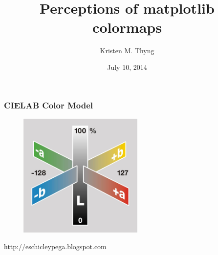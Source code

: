 \documentclass[ignorenonframetext]{beamer}
\title[SciPy 2014]{Perceptions of matplotlib colormaps}
\author{Kristen M. Thyng}
\date{July 10, 2014}
\institute[Texas A\&M]{Texas A\&M University}
\begin{document}
\begin{frame}
    \titlepage
\end{frame}





\section{}

\begin{frame}[t]\frametitle{CIELAB Color Model}
    \begin{figure}[htbp]
        \centering
        \includegraphics[width=0.55\textwidth]{figures/Cielab.jpg}
    \end{figure}
    \tiny{http://eschicleypega.blogspot.com}
\end{frame}
\end{document}
